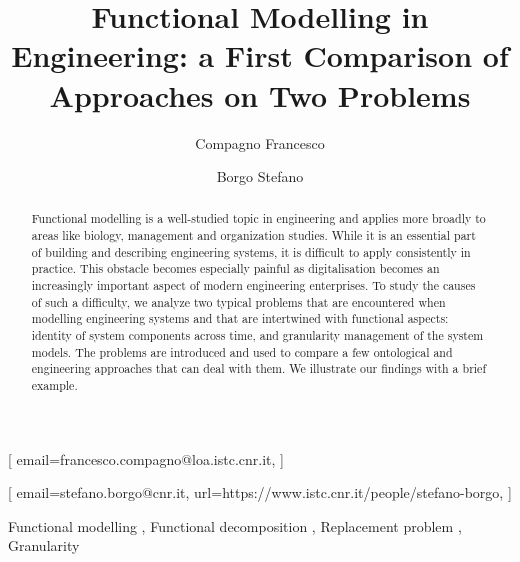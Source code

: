 \documentclass[
]{ceurart}
\begin{document}


\title{Functional Modelling in Engineering: a First Comparison of Approaches on Two Problems}


\author[1,2]{Compagno Francesco}[%
email=francesco.compagno@loa.istc.cnr.it,
]
\cormark[1]
\address[1]{ISTC-CNR Laboratory for Applied Ontology, via alla cascata 56/C, 38123, Povo, Italy}
\address[2]{Adige S.P.A, via per Barco, 11, Levico Terme, 38056, Italy}

\author[1]{Borgo Stefano}[%
email=stefano.borgo@cnr.it,
url=https://www.istc.cnr.it/people/stefano-borgo,
]



\begin{abstract}
  Functional modelling is a well-studied topic in engineering and applies more broadly to areas like biology, management and organization studies. 
  While it is an essential part of building and describing engineering systems, it is difficult to apply consistently in practice.
  This obstacle becomes especially painful as digitalisation becomes an increasingly important aspect of modern engineering enterprises.
  To study the causes of such a difficulty, we analyze two typical problems that are encountered when modelling engineering systems and that are intertwined with functional aspects: identity of system components across time, and granularity management of the system models.
  The problems are introduced and used to compare a few ontological and engineering approaches that can deal with them. We illustrate our findings with a brief example.
\end{abstract}

\begin{keywords}
  Functional modelling \sep
  Functional decomposition \sep
  Replacement problem \sep
  Granularity
\end{keywords}
\end{document}
